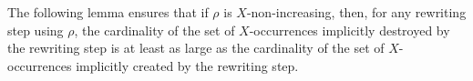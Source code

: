 The following lemma ensures that if $\rho$ is $X$-non-increasing, then, for any rewriting step using $\rho$, the cardinality of the set of \( X \)-occurrences implicitly destroyed by the rewriting step is at least as large as the cardinality of the set of \( X \)-occurrences implicitly created by the rewriting step.